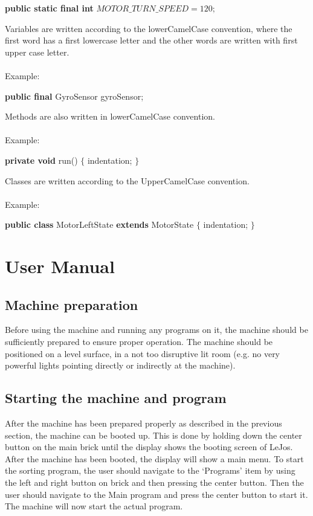 \documentclass[a4paper,oneside,11pt]{article}
\begin{document}
\begin{algorithmic}
\State \textbf{public static final int} $MOTOR\_TURN\_SPEED = 120;$
\State
\end{algorithmic}
Variables are written according to the lowerCamelCase convention, where the first word has a first lowercase letter and the other words are written with first upper case letter.\\\\
Example:
\begin{algorithmic}
\State \textbf{public final} GyroSensor gyroSensor;
\State
\end{algorithmic}
Methods are also written in lowerCamelCase convention.\\\\
Example:
\begin{algorithmic}
\State \textbf{private void} run() $\{$
\State \qquad indentation;
\State $\}$
\State
\end{algorithmic}
Classes are written according to the UpperCamelCase convention.\\\\
Example:
\begin{algorithmic}
\State \textbf{public class} MotorLeftState \textbf{extends} MotorState $\{$
\State \qquad indentation;
\State $\}$
\end{algorithmic}

\section{User Manual}

\subsection{Machine preparation}
Before using the machine and running any programs on it, the machine should be sufficiently prepared to ensure proper operation. The machine should be positioned on a level surface, in a not too disruptive lit room (e.g. no very powerful lights pointing directly or indirectly at the machine). 

\subsection{Starting the machine and program}
After the machine has been prepared properly as described in the previous section, the machine can be booted up. This is done by holding down the center button on the main brick until the display shows the booting screen of LeJos. After the machine has been booted, the display will show a main menu. To start the sorting program, the user should navigate to the ‘Programs’ item by using the left and right button on brick and then pressing the center button. Then the user should navigate to the Main program and press the center button to start it.
The machine will now start the actual program. 
\end{document}
